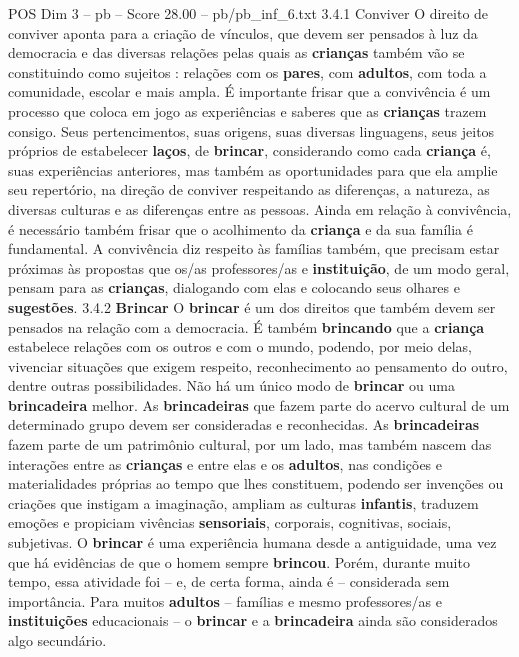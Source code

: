 \begin{textsample}{POS Dim 3 – pb – Score 28.00 – pb/pb\_inf\_6.txt}  \label{ex:f3_pos_083}
3.4.1 Conviver O direito de conviver aponta para a criação de vínculos, que devem ser pensados à luz da democracia e das diversas relações pelas quais as \textbf{crianças} também vão se constituindo como sujeitos : relações com os \textbf{pares}, com \textbf{adultos}, com toda a comunidade, escolar e mais ampla.
É importante frisar que a convivência é um processo que coloca em jogo as experiências e saberes que as \textbf{crianças} trazem consigo.
Seus pertencimentos, suas origens, suas diversas linguagens, seus jeitos próprios de estabelecer \textbf{laços}, de \textbf{brincar}, considerando como cada \textbf{criança} é, suas experiências anteriores, mas também as oportunidades para que ela amplie seu repertório, na direção de conviver respeitando as diferenças, a natureza, as diversas culturas e as diferenças entre as pessoas.
Ainda em relação à convivência, é necessário também frisar que o acolhimento da \textbf{criança} e da sua família é fundamental.
A convivência diz respeito às famílias também, que precisam estar próximas às propostas que os/as professores/as e \textbf{instituição}, de um modo geral, pensam para as \textbf{crianças}, dialogando com elas e colocando seus olhares e \textbf{sugestões}. 3.4.2 \textbf{Brincar} O \textbf{brincar} é um dos direitos que também devem ser pensados na relação com a democracia.
É também \textbf{brincando} que a \textbf{criança} estabelece relações com os outros e com o mundo, podendo, por meio delas, vivenciar situações que exigem respeito, reconhecimento ao pensamento do outro, dentre outras possibilidades.
Não há um único modo de \textbf{brincar} ou uma \textbf{brincadeira} melhor.
As \textbf{brincadeiras} que fazem parte do acervo cultural de um determinado grupo devem ser consideradas e reconhecidas.
As \textbf{brincadeiras} fazem parte de um patrimônio cultural, por um lado, mas também nascem das interações entre as \textbf{crianças} e entre elas e os \textbf{adultos}, nas condições e materialidades próprias ao tempo que lhes constituem, podendo ser invenções ou criações que instigam a imaginação, ampliam as culturas \textbf{infantis}, traduzem emoções e propiciam vivências \textbf{sensoriais}, corporais, cognitivas, sociais, subjetivas.
O \textbf{brincar} é uma experiência humana desde a antiguidade, uma vez que há evidências de que o homem sempre \textbf{brincou}.
Porém, durante muito tempo, essa atividade foi – e, de certa forma, ainda é – considerada sem importância.
Para muitos \textbf{adultos} – famílias e mesmo professores/as e \textbf{instituições} educacionais – o \textbf{brincar} e a \textbf{brincadeira} ainda são considerados algo secundário.

\end{textsample}
